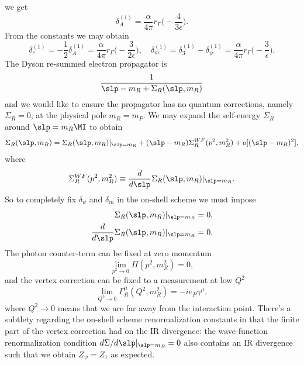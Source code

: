 we get
\begin{equation}
    \delta_A^{(1)} = \frac{\alpha}{4\pi}r_\Gamma\bigg(-\frac{4}{3\epsilon}\bigg).
\end{equation}
From the constants we may obtain 
\begin{equation}
    \delta_e^{(1)} = -\frac{1}{2}\delta_A^{(1)} = \frac{\alpha}{4\pi}r_\Gamma\bigg(-\frac{3}{2\epsilon}\bigg),\quad \delta_m^{(1)} = \delta_3^{(1)} - \delta_\psi^{(1)} = \frac{\alpha}{4\pi}r_\Gamma\bigg(-\frac{3}{\epsilon}\bigg).
\end{equation}
The Dyson re-summed electron propagator is 
\begin{equation}
    \frac{1}{\slp - m_R + \Sigma_R(\slp,m_R)}
\end{equation}
and we would like to ensure the propagator has no quantum corrections, namely $\Sigma_R = 0$, at the physical pole $m_R = m_P$. We may expand the self-energy $\Sigma_R$ around $\slp = m_R\MI$ to obtain
\begin{multline}
    \Sigma_R(\slp,m_R) = \Sigma_R(\slp,m_R)|_{\slp=m_R} + (\slp-m_R)\Sigma_R^{WF}(p^2,m_R^2) + o[(\slp - m_R)^2],
\end{multline}
where
\begin{equation}
    \Sigma_R^{WF}(p^2,m_R^2) \equiv \frac{d}{d\slp}\Sigma_R(\slp,m_R)|_{\slp = m_R}.
\end{equation}
So to completely fix $\delta_\psi$ and $\delta_m$ in the on-shell scheme we must impose
\begin{align}
    \Sigma_R(\slp,m_R)|_{\slp=m_R} &= 0, \\
    \frac{d}{d\slp}\Sigma_R(\slp,m_R)|_{\slp=m_R} &= 0.
\end{align}
The photon counter-term can be fixed at zero momentum
\begin{equation}
    \lim_{p^2\to 0}\Pi(p^2,m_R^2) = 0,
\end{equation}
and the vertex correction can be fixed to a measurement at low $Q^2$
\begin{equation}
    \lim_{Q^2\to 0}\Gamma^\mu_R(Q^2,m_R^2) = -ie_P\gamma^\mu,
\end{equation}
where $Q^2 \to 0$ means that we are far away from the interaction point. There's a subtlety regarding the on-shell scheme renormalization constants in that the finite part of the vertex correction had on the IR divergence: the wave-function renormalization condition $d\Sigma/d\slp|_{\slp=m_R} = 0$ also contains an IR divergence such that we obtain $Z_\psi = Z_1$ as expected.

